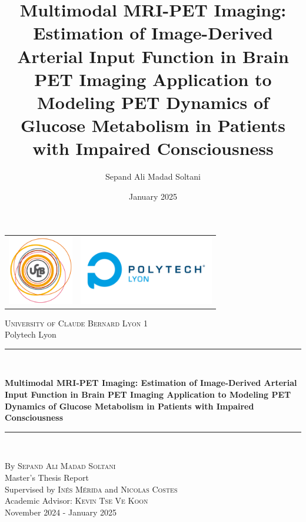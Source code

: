\documentclass[a4paper,12pt,twoside,english,openany]{book}
[a4paper,12pt,twoside]
\title{Multimodal MRI-PET Imaging: Estimation of Image-Derived Arterial Input Function in Brain PET Imaging Application to Modeling PET Dynamics of Glucose Metabolism in Patients with Impaired Consciousness}
\author{Sepand Ali Madad Soltani}
\date{January 2025}
\begin{document}
\begin{titlepage}
	\begin{center}
		\begin{tabular}{c@{\hskip 7cm}c@{\hskip 1cm}}
			\includegraphics[height=3cm]{res/ucbl.png} &
			\includegraphics[height=3cm]{res/polytech.png}
		\end{tabular}
	\end{center}

	\begin{center}

		\vspace*{.03\textheight}
		\textsc{\Large University of Claude Bernard Lyon 1 }\\[0.2cm]
		\large Polytech Lyon

		\rule{\textwidth}{0.8pt} \\
		\vspace{10pt}

		{\Large \bfseries Multimodal MRI-PET Imaging:
			Estimation of Image-Derived Arterial Input Function in Brain PET Imaging
			Application to Modeling PET Dynamics of Glucose Metabolism in Patients with Impaired Consciousness
		}
		\rule{\textwidth}{0.8pt} \\

	\end{center}

	\vfill
	\begin{center}
		By \textsc{\Large Sepand Ali Madad Soltani}\\[1cm]
		Master's Thesis Report\\[1.2cm]
		Supervised by \textsc{\large Inés Mérida}
		and
		\textsc{\large Nicolas Costes}  \\[0.2cm]
		Academic Advisor: \textsc{\large Kevin Tse Ve Koon}\\[0.2cm]
		November 2024 - January 2025

	\end{center}

	\vspace{1cm}
\end{titlepage}
\end{document}
